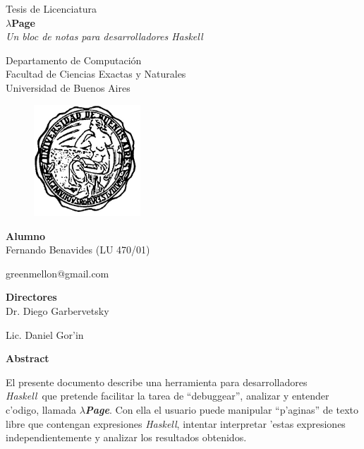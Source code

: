 \documentclass[a4paper]{article}
\newcommand{\haskell}{\textsl{Haskell}}
\newcommand{\hpage}{\textbf{\textsl{$\lambda$Page}}}
\begin{document}
    \thispagestyle{empty}
    \begin{center}
	    {\Large Tesis de Licenciatura}\\[1em]
	    {\huge \textbf{$\lambda$Page}}\\[0.5em]
	    {\large \textit{Un bloc de notas para desarrolladores Haskell}}\\[1em]
	    \par{}
	    {\large Departamento de Computaci\'on}\\[0.5em]
	    {\large Facultad de Ciencias Exactas y Naturales}\\[0.5em]
	    {\large Universidad de Buenos Aires}
	    \par{}
	    \begin{figure}[h]
	        \begin{center}
	        \includegraphics[width=40mm]{logoUba}
	        \end{center}
	    \end{figure}
	    {\Large \textbf{Alumno}}\\[0.8em]
	    {\Large Fernando Benavides (LU 470/01)} \par
	    {\Large greenmellon@gmail.com} \par
	    \par{}
	    {\Large \textbf{Directores}}\\[0.8em]
	    {\Large Dr. Diego Garbervetsky} \par
	    {\Large Lic. Daniel Gor'in} \par
	    \par{}
         {\Large \textbf{Abstract}}\\[0.5em]
    \end{center}
    El presente documento describe una herramienta para desarrolladores \haskell\ que pretende facilitar la tarea de ``debuggear'', analizar y entender c'odigo, llamada \hpage.  Con ella el usuario puede manipular ``p'aginas'' de texto libre que contengan expresiones \haskell, intentar interpretar 'estas expresiones independientemente y analizar los resultados obtenidos.
    \newpage
\end{document}
